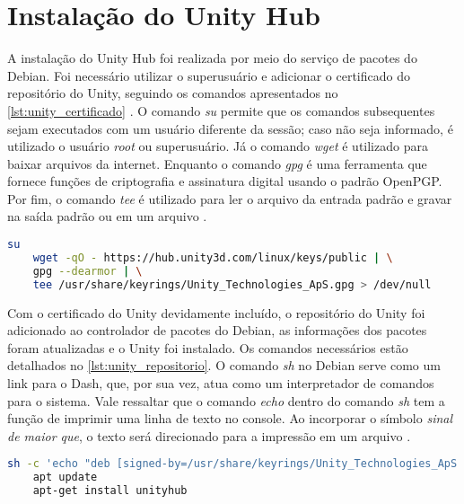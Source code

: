 \section{Instalação do Unity Hub}

A instalação do Unity Hub foi realizada por meio do serviço de pacotes do Debian. Foi necessário utilizar o superusuário e adicionar o certificado do repositório do Unity, seguindo os comandos apresentados no \cref{lst:unity_certificado} \cite{install_the_unity_hub}. O comando \textit{su} permite que os comandos subsequentes sejam executados com um usuário diferente da sessão; caso não seja informado, é utilizado o usuário \textit{root} ou superusuário. Já o comando \textit{wget} é utilizado para baixar arquivos da internet. Enquanto o comando \textit{gpg} é uma ferramenta que fornece funções de criptografia e assinatura digital usando o padrão OpenPGP. Por fim, o comando \textit{tee} é utilizado para ler o arquivo da entrada padrão e gravar na saída padrão ou em um arquivo \cite{debian_man_pages}.

\begin{lstlisting}[caption={Trecho de código com comando UNIX para adicionar o certificado do repositório do Unity \cite{install_the_unity_hub}},label={lst:unity_certificado},language=Bash,showstringspaces=false]
    su
    wget -qO - https://hub.unity3d.com/linux/keys/public | \
    gpg --dearmor | \
    tee /usr/share/keyrings/Unity_Technologies_ApS.gpg > /dev/null
\end{lstlisting}

Com o certificado do Unity devidamente incluído, o repositório do Unity foi adicionado ao controlador de pacotes do Debian, as informações dos pacotes foram atualizadas e o Unity foi instalado. Os comandos necessários estão detalhados no \cref{lst:unity_repositorio}. O comando \textit{sh} no Debian serve como um link para o Dash, que, por sua vez, atua como um interpretador de comandos para o sistema. Vale ressaltar que o comando \textit{echo} dentro do comando \textit{sh} tem a função de imprimir uma linha de texto no console. Ao incorporar o símbolo \emph{sinal de maior que}, o texto será direcionado para a impressão em um arquivo \cite{debian_man_pages}.

\begin{lstlisting}[caption={Trecho de código com comando UNIX para adicionar o repositório do Unity \cite{install_the_unity_hub}},label={lst:unity_repositorio},language=Bash,showstringspaces=false]
    sh -c 'echo "deb [signed-by=/usr/share/keyrings/Unity_Technologies_ApS.gpg] https://hub.unity3d.com/linux/repos/deb stable main" > /etc/apt/sources.list.d/unityhub.list'
    apt update
    apt-get install unityhub
\end{lstlisting}
